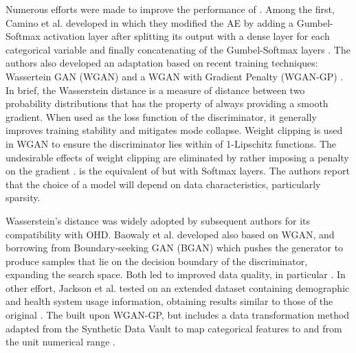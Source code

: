 Numerous efforts were made to improve the performance of . Among the first, Camino et al. developed  in which they modified the AE by adding a Gumbel-Softmax \cite{jang2016categorical} activation layer after splitting its output with a dense layer for each categorical variable and finally concatenating of the Gumbel-Softmax \todo layers \cite{Camino2018-re}. The authors also developed an adaptation based on recent training techniques: Wassertein GAN (WGAN) \cite{arjovsky2017wasserstein} and a WGAN with Gradient Penalty (WGAN-GP) \cite{gulrajani2017improved}. In brief, the Wasserstein distance is a measure of distance between two probability distributions that has the property of always providing a smooth gradient. When used as the loss function of the discriminator, it generally improves training stability and mitigates mode collapse. Weight clipping is used in WGAN to ensure the discriminator lies within of 1-Lipschitz functions. The undesirable effects of weight clipping are eliminated by rather imposing a penalty on the gradient .  is the equivalent of  but with Softmax layers. The authors report that the choice of a model will depend on data characteristics, particularly sparsity.\par 
Wasserstein's distance was widely adopted by subsequent authors for its compatibility with OHD. Baowaly et al. developed  also based on WGAN, and  borrowing from Boundary-seeking GAN (BGAN) \cite{hjelm2017boundaryseeking} which pushes the generator to produce samples that lie on the decision boundary of the discriminator, expanding the search space. Both led to improved data quality, in particular  \cite{baowaly_2019_IEEE,baowaly_2019_jamia}. In other effort, Jackson et al. tested  on an extended dataset containing demographic and health system usage information, obtaining results similar to those of the original \cite{Jackson_2019}. The  built upon WGAN-GP, but includes a data transformation method adapted from the Synthetic Data Vault \cite{Patki_2016} to map categorical features to and from the unit numerical range \cite{Yale_2020}. 
